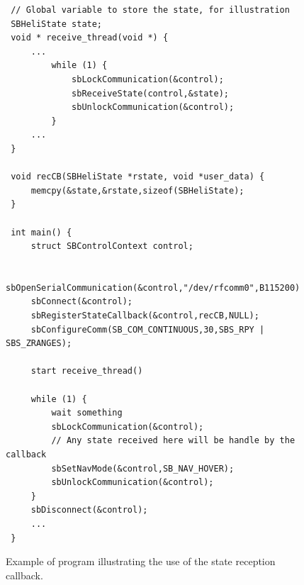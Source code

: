 \documentclass{article}
\begin{document}
\begin{figure}[htbp]
\begin{verbatim}
 // Global variable to store the state, for illustration
 SBHeliState state;
 void * receive_thread(void *) {
     ...
         while (1) {
             sbLockCommunication(&control);
             sbReceiveState(control,&state);
             sbUnlockCommunication(&control);
         }
     ...
 }

 void recCB(SBHeliState *rstate, void *user_data) {
     memcpy(&state,&rstate,sizeof(SBHeliState);
 }
 
 int main() {
     struct SBControlContext control;
     
     sbOpenSerialCommunication(&control,"/dev/rfcomm0",B115200)
     sbConnect(&control);
     sbRegisterStateCallback(&control,recCB,NULL);
     sbConfigureComm(SB_COM_CONTINUOUS,30,SBS_RPY | SBS_ZRANGES);

     start receive_thread()

     while (1) {
         wait something
         sbLockCommunication(&control);
         // Any state received here will be handle by the callback
         sbSetNavMode(&control,SB_NAV_HOVER);
         sbUnlockCommunication(&control);
     }
     sbDisconnect(&control);
     ...
 }
\end{verbatim}
\caption{Example of program illustrating the use of the state reception
callback.}
\label{fig:callback}
\end{figure}
\end{document}
